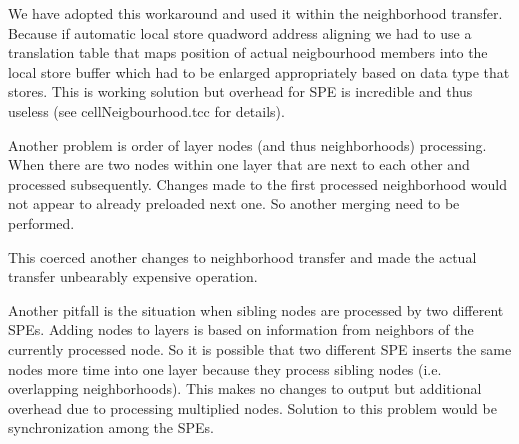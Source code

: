 We have adopted this workaround and used it within the neighborhood transfer.
Because if automatic local store quadword address aligning we had to use a translation table that maps position of actual neigbourhood members into the local store buffer which had to be enlarged appropriately based on data type that stores.
This is working solution but overhead for SPE is incredible and thus useless (see cellNeigbourhood.tcc for details).

\par
\label{neighbourhoodDependecy}
Another problem is order of layer nodes (and thus neighborhoods) processing.
When there are two nodes within one layer that are next to each other and processed subsequently.
Changes made to the first processed neighborhood would not appear to already preloaded next one.
So another merging need to be performed.

\par
This coerced another changes to neighborhood transfer and made the actual transfer unbearably expensive operation.

\par
\label{workDependecy}
Another pitfall is the situation when sibling nodes are processed by two different SPEs.
Adding nodes to layers is based on information from neighbors of the currently processed node.
So it is possible that two different SPE inserts the same nodes more time into one layer because they process sibling nodes (i.e. overlapping neighborhoods).
This makes no changes to output but additional overhead due to processing multiplied nodes.
Solution to this problem would be synchronization among the SPEs.

